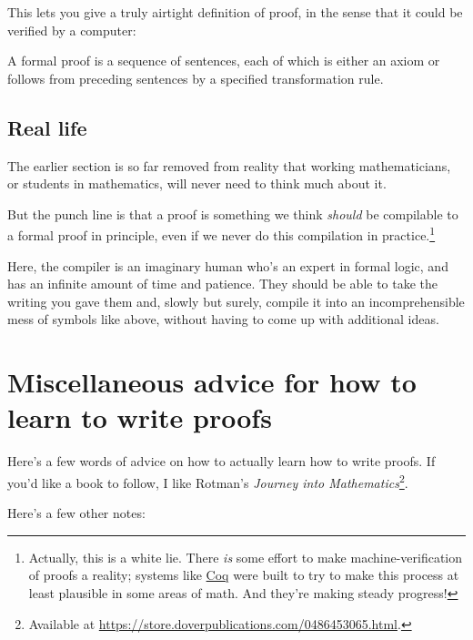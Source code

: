 \documentclass[11pt]{scrartcl}
\begin{document}
This lets you give a truly airtight definition of proof,
in the sense that it could be verified by a computer:
\begin{definition}
  A \alert{formal proof} is a sequence of sentences,
  each of which is either an axiom
  or follows from preceding sentences by a specified transformation rule.
\end{definition}

\subsection{Real life}
The earlier section is so far removed from reality
that working mathematicians, or students in mathematics,
will never need to think much about it.

But the punch line is that a proof is something we think
\emph{should} be compilable to a formal proof in principle,
even if we never do this compilation in practice.\footnote{Actually,
  this is a white lie.
  There \emph{is} some effort to make machine-verification of proofs a reality;
  systems like \href{https://en.wikipedia.org/wiki/Coq}{Coq}
  were built to try to make this process at least plausible in some areas of math.
  And they're making steady progress!}

Here, the compiler is an imaginary human who's an expert in formal logic,
and has an infinite amount of time and patience.
They should be able to take the writing you gave them and, slowly but surely,
compile it into an incomprehensible mess of symbols like above,
without having to come up with additional ideas.

\section{Miscellaneous advice for how to learn to write proofs}
\label{sec:advice}

Here's a few words of advice on how to actually learn how to write proofs.
If you'd like a book to follow,
I like Rotman's \emph{Journey into Mathematics}\footnote{Available
at \url{https://store.doverpublications.com/0486453065.html}.}.

Here's a few other notes:
\end{document}
